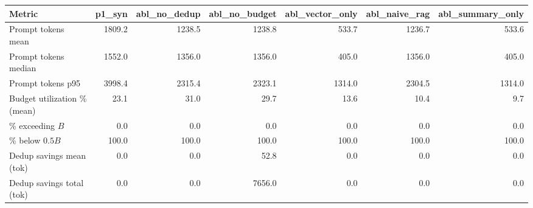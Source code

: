 \begin{tabular}{lrrrrrr}
\toprule
Metric & p1\_syn & abl\_no\_dedup & abl\_no\_budget & abl\_vector\_only & abl\_naive\_rag & abl\_summary\_only \\
\midrule
Prompt tokens mean & 1809.2 & 1238.5 & 1238.8 & 533.7 & 1236.7 & 533.6 \\
Prompt tokens median & 1552.0 & 1356.0 & 1356.0 & 405.0 & 1356.0 & 405.0 \\
Prompt tokens p95 & 3998.4 & 2315.4 & 2323.1 & 1314.0 & 2304.5 & 1314.0 \\
Budget utilization \% (mean) & 23.1 & 31.0 & 29.7 & 13.6 & 10.4 & 9.7 \\
\% exceeding $B$ & 0.0 & 0.0 & 0.0 & 0.0 & 0.0 & 0.0 \\
\% below $0.5B$ & 100.0 & 100.0 & 100.0 & 100.0 & 100.0 & 100.0 \\
Dedup savings mean (tok) & 0.0 & 0.0 & 52.8 & 0.0 & 0.0 & 0.0 \\
Dedup savings total (tok) & 0.0 & 0.0 & 7656.0 & 0.0 & 0.0 & 0.0 \\
\bottomrule
\end{tabular}

